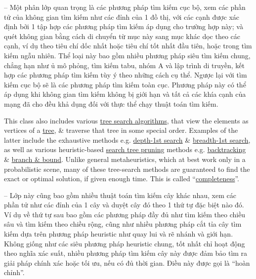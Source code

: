 \documentclass{article}
\begin{document}
\begin{enumerate}
	-- Một phân lớp quan trọng là các phương pháp tìm kiếm cục bộ, xem các phần tử của không gian tìm kiếm như các đỉnh của 1 đồ thị, với các cạnh được xác định bởi 1 tập hợp các phương pháp tìm kiếm áp dụng cho trường hợp này; và quét không gian bằng cách di chuyển từ mục này sang mục khác dọc theo các cạnh, ví dụ theo tiêu chí dốc nhất hoặc tiêu chí tốt nhất đầu tiên, hoặc trong tìm kiếm ngẫu nhiên. Thể loại này bao gồm nhiều phương pháp siêu tìm kiếm chung, chẳng hạn như ủ mô phỏng, tìm kiếm tabu, nhóm A và lập trình di truyền, kết hợp các phương pháp tìm kiếm tùy ý theo những cách cụ thể. Ngược lại với tìm kiếm cục bộ sẽ là các phương pháp tìm kiếm toàn cục. Phương pháp này có thể áp dụng khi không gian tìm kiếm không bị giới hạn và tất cả các khía cạnh của mạng đã cho đều khả dụng đối với thực thể chạy thuật toán tìm kiếm.
	
	This class also includes various \href{https://en.wikipedia.org/wiki/Tree_traversal}{tree search algorithms}, that view the elements as vertices of a \href{https://en.wikipedia.org/wiki/Tree_(graph_theory)}{tree}, \& traverse that tree in some special order. Examples of the latter include the exhaustive methods e.g. \href{https://en.wikipedia.org/wiki/Depth-first_search}{depth-1st search} \& \href{https://en.wikipedia.org/wiki/Breadth-first_search}{breadth-1st search}, as well as various heuristic-based \href{https://en.wikipedia.org/wiki/Pruning_(decision_trees)}{search tree pruning} methods e.g. \href{https://en.wikipedia.org/wiki/Backtracking}{backtracking} \& \href{https://en.wikipedia.org/wiki/Branch\_and\_bound}{branch \& bound}. Unlike general metaheuristics, which at best work only in a probabilistic scene, many of these tree-search methods are guaranteed to find the exact or optimal solution, if given enough time. This is called ``\href{https://en.wikipedia.org/wiki/Completeness_(logic)}{completeness}''.
	
	-- Lớp này cũng bao gồm nhiều thuật toán tìm kiếm cây khác nhau, xem các phần tử như các đỉnh của 1 cây và duyệt cây đó theo 1 thứ tự đặc biệt nào đó. Ví dụ về thứ tự sau bao gồm các phương pháp đầy đủ như tìm kiếm theo chiều sâu và tìm kiếm theo chiều rộng, cũng như nhiều phương pháp cắt tỉa cây tìm kiếm dựa trên phương pháp heuristic như quay lui và rẽ nhánh và giới hạn. Không giống như các siêu phương pháp heuristic chung, tốt nhất chỉ hoạt động theo nghĩa xác suất, nhiều phương pháp tìm kiếm cây này được đảm bảo tìm ra giải pháp chính xác hoặc tối ưu, nếu có đủ thời gian. Điều này được gọi là ``hoàn chỉnh''.
	

\end{enumerate}
\end{document}
